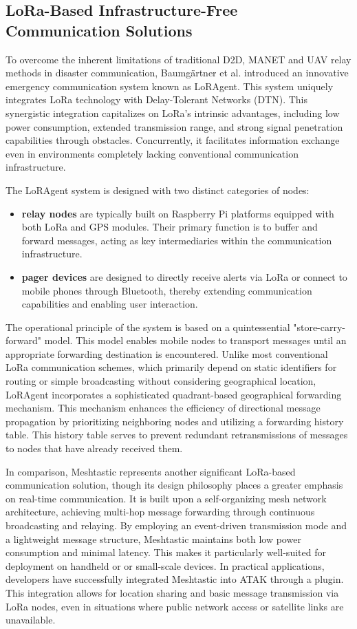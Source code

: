 \subsection{LoRa-Based Infrastructure-Free Communication Solutions}
To overcome the inherent limitations of traditional D2D, MANET and UAV relay methods in disaster communication, Baumgärtner et al. introduced an innovative emergency communication system known as LoRAgent. This system uniquely integrates LoRa technology with Delay-Tolerant Networks (DTN). This synergistic integration capitalizes on LoRa's intrinsic advantages, including low power consumption, extended transmission range, and strong signal penetration capabilities through obstacles. Concurrently, it facilitates information exchange even in environments completely lacking conventional communication infrastructure.

The LoRAgent system is designed with two distinct categories of nodes:
\begin{itemize}
    \item\textbf{relay nodes} are typically built on Raspberry Pi platforms equipped with both LoRa and GPS modules. Their primary function is to buffer and forward messages, acting as key intermediaries within the communication infrastructure.

    \item\textbf{pager devices} are designed to directly receive alerts via LoRa or connect to mobile phones through Bluetooth, thereby extending communication capabilities and enabling user interaction.
\end{itemize}

The operational principle of the system is based on a quintessential "store-carry-forward" model. This model enables mobile nodes to transport messages until an appropriate forwarding destination is encountered. Unlike most conventional LoRa communication schemes, which primarily depend on static identifiers for routing or simple broadcasting without considering geographical location, LoRAgent incorporates a sophisticated quadrant-based geographical forwarding mechanism. This mechanism enhances the efficiency of directional message propagation by prioritizing neighboring nodes and utilizing a forwarding history table. This history table serves to prevent redundant retransmissions of messages to nodes that have already received them.

In comparison, Meshtastic represents another significant LoRa-based communication solution, though its design philosophy places a greater emphasis on real-time communication. It is built upon a self-organizing mesh network architecture, achieving multi-hop message forwarding through continuous broadcasting and relaying. By employing an event-driven transmission mode and a lightweight message structure, Meshtastic maintains both low power consumption and minimal latency. This makes it particularly well-suited for deployment on handheld or or small-scale devices. In practical applications, developers have successfully integrated Meshtastic into ATAK through a plugin. This integration allows for location sharing and basic message transmission via LoRa nodes, even in situations where public network access or satellite links are unavailable.